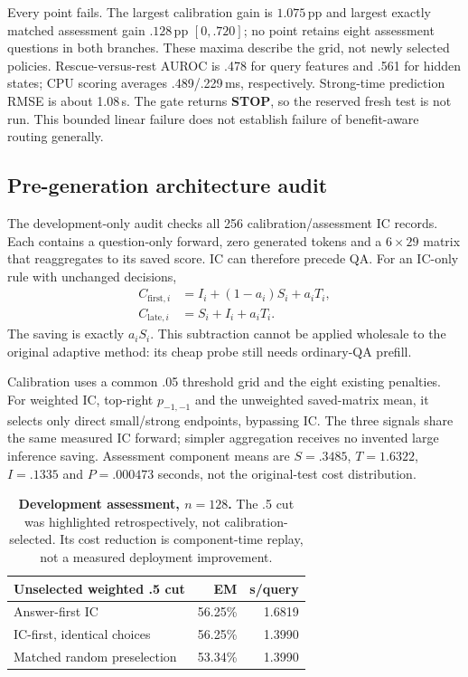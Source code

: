 \documentclass[11pt]{article}
\newcommand{\pp}{\,\text{pp}}
\begin{document}
Every point fails. The largest calibration gain is $1.075\pp$ and largest exactly matched assessment gain $.128\pp$ $[0,.720]$; no point retains eight assessment questions in both branches. These maxima describe the grid, not newly selected policies. Rescue-versus-rest AUROC is .478 for query features and .561 for hidden states; CPU scoring averages .489/.229\,ms, respectively. Strong-time prediction RMSE is about 1.08\,s. The gate returns \textbf{STOP}, so the reserved fresh test is not run. This bounded linear failure does not establish failure of benefit-aware routing generally.

\subsection{Pre-generation architecture audit}
\label{sec:audit}
The development-only audit checks all 256 calibration/assessment IC records. Each contains a question-only forward, zero generated tokens and a $6\times29$ matrix that reaggregates to its saved score. IC can therefore precede QA. For an IC-only rule with unchanged decisions,
\begin{align}
C_{\mathrm{first},i}&=I_i+(1-a_i)S_i+a_iT_i,\\
C_{\mathrm{late},i}&=S_i+I_i+a_iT_i.
\end{align}
The saving is exactly $a_iS_i$. This subtraction cannot be applied wholesale to the original adaptive method: its cheap probe still needs ordinary-QA prefill.

Calibration uses a common .05 threshold grid and the eight existing penalties. For weighted IC, top-right $p_{-1,-1}$ and the unweighted saved-matrix mean, it selects only direct small/strong endpoints, bypassing IC. The three signals share the same measured IC forward; simpler aggregation receives no invented large inference saving. Assessment component means are $S=.3485$, $T=1.6322$, $I=.1335$ and $P=.000473$ seconds, not the original-test cost distribution.

\begin{table}[t]
\centering\small
\begin{tabular}{lrr}
\toprule
Unselected weighted .5 cut & EM & s/query \\
\midrule
Answer-first IC & 56.25\% & 1.6819 \\
IC-first, identical choices & 56.25\% & 1.3990 \\
Matched random preselection & 53.34\% & 1.3990 \\
\bottomrule
\end{tabular}
\caption{\textbf{Development assessment, $n=128$.} The .5 cut was highlighted retrospectively, not calibration-selected. Its cost reduction is component-time replay, not a measured deployment improvement.}
\label{tab:icfirst}
\end{table}
\end{document}
